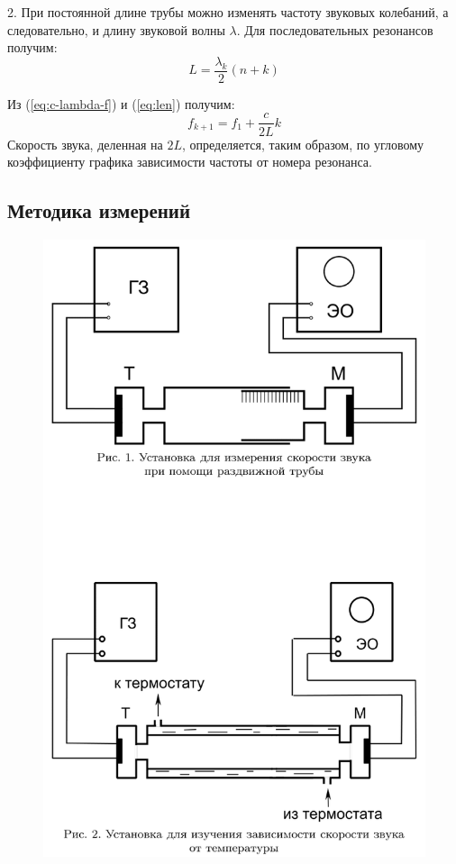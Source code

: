 \documentclass[12pt]{article}
\begin{document}
\hspace{7mm} 2. При постоянной длине трубы можно изменять частоту звуковых колебаний, а следовательно, и длину звуковой волны $\lambda$.
Для последовательных резонансов получим:
\begin{equation} \label{eq:len}
	L = \frac{\lambda_k}{2}(n+k)
\end{equation}

Из (\ref{eq:c-lambda-f}) и (\ref{eq:len}) получим:
\begin{equation}
	f_{k+1}  = f_1 + \frac{c}{2L}k
\end{equation}
Скорость звука, деленная на $2L$, определяется, таким образом,
по угловому коэффициенту графика зависимости частоты от номера
резонанса.

\subsection*{Методика измерений}

\begin{figure}[H]
	\centering
	\includegraphics[scale=0.3]{stand.png}
\end{figure}
\end{document}
